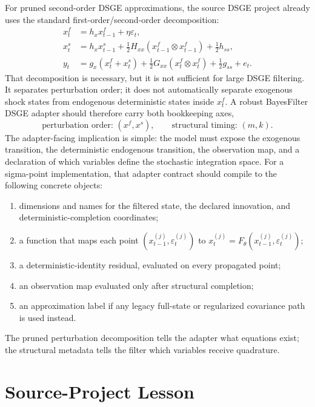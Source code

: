 For pruned second-order DSGE approximations, the source DSGE project already
uses the standard first-order/second-order decomposition:
\begin{align}
  x_t^f &= h_x x_{t-1}^f + \eta\varepsilon_t,\\
  x_t^s &= h_x x_{t-1}^s
    + \frac{1}{2}H_{xx}(x_{t-1}^f\otimes x_{t-1}^f)
    + \frac{1}{2}h_{ss},\\
  y_t &= g_x(x_t^f+x_t^s)
    + \frac{1}{2}G_{xx}(x_t^f\otimes x_t^f)
    + \frac{1}{2}g_{ss} + e_t .
\end{align}
That decomposition is necessary, but it is not sufficient for large DSGE
filtering.  It separates perturbation order; it does not automatically
separate exogenous shock states from endogenous deterministic states inside
$x_t^f$.  A robust BayesFilter DSGE adapter should therefore carry both
bookkeeping axes,
\[
  \text{perturbation order: } (x^f,x^s),
  \qquad
  \text{structural timing: } (m,k).
\]
The adapter-facing implication is simple: the model must expose the exogenous
transition, the deterministic endogenous transition, the observation map, and a
declaration of which variables define the stochastic integration space.
For a sigma-point implementation, that adapter contract should compile to the
following concrete objects:
\begin{enumerate}[label=(\roman*)]
  \item dimensions and names for the filtered state, the declared innovation,
    and deterministic-completion coordinates;
  \item a function that maps each point
    $(x_{t-1}^{(j)},\varepsilon_t^{(j)})$ to
    $x_t^{(j)}=F_\theta(x_{t-1}^{(j)},\varepsilon_t^{(j)})$;
  \item a deterministic-identity residual, evaluated on every propagated point;
  \item an observation map evaluated only after structural completion;
  \item an approximation label if any legacy full-state or regularized
    covariance path is used instead.
\end{enumerate}
The pruned perturbation decomposition tells the adapter what equations exist;
the structural metadata tells the filter which variables receive quadrature.

\section{Source-Project Lesson}
\label{sec:bf-current-source-project-failure-mode}

